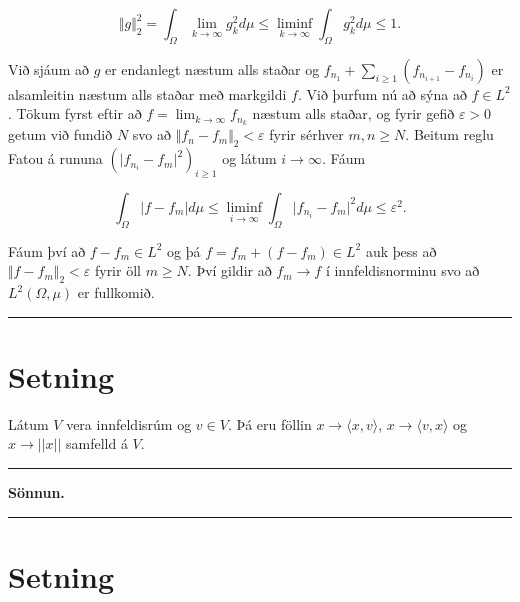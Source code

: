 \documentclass[]{book}
\begin{document}
\[
\Vert g\Vert^2_2 = \int_\Omega \lim_{k\rightarrow\infty} g_k^2d\mu \leq \liminf_{k\rightarrow\infty}\int_\Omega g_k^2d\mu\leq 1.
\]

Við sjáum að \(g\) er endanlegt næstum alls staðar og \(f_{n_1} + \sum_{i\geq1}(f_{n_{i+1}} - f_{n_i})\) er alsamleitin næstum alls staðar með markgildi \(f\). Við þurfum nú að sýna að \(f\in L^2\). Tökum fyrst eftir að \(f = \lim_{k\rightarrow\infty}f_{n_k}\) næstum alls staðar, og fyrir gefið \(\varepsilon > 0\) getum við fundið \(N\) svo að \(\Vert f_n - f_m\Vert_2 < \varepsilon\) fyrir sérhver \(m,n\geq N\). Beitum reglu Fatou á rununa \((\vert f_{n_i} - f_m\vert^2)_{i\geq1}\) og látum \(i\rightarrow \infty\). Fáum

\[
\int_\Omega \vert f - f_m \vert d\mu \leq \liminf_{i\rightarrow\infty}\int_\Omega\vert f_{n_i} - f_m\vert^2d\mu \leq \varepsilon^2.
\]

Fáum því að \(f - f_m\in L^2\) og þá \(f = f_m + (f - f_m) \in L^2\) auk þess að \(\Vert f - f_m\Vert_2 < \varepsilon\) fyrir öll \(m\geq N\). Því gildir að \(f_m\rightarrow f\) í innfeldisnorminu svo að \(L^2(\Omega,\mu)\) er fullkomið.

\begin{center}\rule{0.5\linewidth}{\linethickness}\end{center}

\hypertarget{setning-77}{%
\section*{Setning}\label{setning-77}}

Látum \(V\) vera innfeldisrúm og \(v\in V\). Þá eru föllin \(x\rightarrow \langle x,v\rangle\), \(x\rightarrow \langle v,x\rangle\) og \(x\rightarrow ||x||\) samfelld á \(V\).

\begin{center}\rule{0.5\linewidth}{\linethickness}\end{center}

\textbf{Sönnun.}

\begin{center}\rule{0.5\linewidth}{\linethickness}\end{center}

\hypertarget{setning-78}{%
\section*{Setning}\label{setning-78}}
\end{document}
